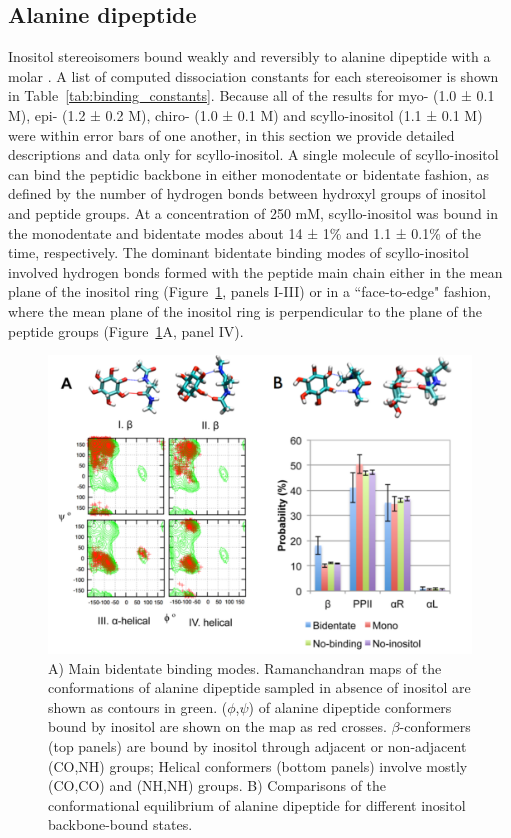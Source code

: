 \subsection{Alanine dipeptide}
Inositol stereoisomers bound weakly and reversibly to alanine dipeptide with a molar \KD. A list of computed dissociation constants for each stereoisomer is shown in Table~\ref{tab:binding_constants}. Because all of the results for myo- (1.0 ± 0.1 M), epi- (1.2 ± 0.2 M), chiro- (1.0 ± 0.1 M) and scyllo-inositol (1.1 ± 0.1 M) were within error bars of one another, in this section we provide detailed descriptions and data only for scyllo-inositol. A single molecule of scyllo-inositol can bind the peptidic backbone in either monodentate or bidentate fashion, as defined by the number of hydrogen bonds between hydroxyl groups of inositol and peptide groups. At a concentration of 250 mM, scyllo-inositol was bound in the monodentate and bidentate modes about 14 ± 1\% and 1.1 ± 0.1\% of the time, respectively. The dominant bidentate binding modes of scyllo-inositol involved hydrogen bonds formed with the peptide main chain either in the mean plane of the inositol ring (Figure~\ref{fig:figure2}, panels I-III) or in a ``face-to-edge" fashion, where the mean plane of the inositol ring is perpendicular to the plane of the peptide groups (Figure~\ref{fig:figure2}A, panel IV).
	
	\begin{figure}[htbp]
    \centering
    \includegraphics[width=6in]{figures/results1/GA4_paper_figures_submitted-2-rearranged}
    \caption[Binding of scyllo-inositol to the backbone of alanine dipeptide.]
     {A) Main bidentate binding modes. Ramanchandran maps of the conformations of alanine dipeptide sampled in absence of inositol are shown as contours in green. ($\phi$,$\psi$) of alanine dipeptide conformers bound by inositol are shown on the map as red crosses. $\beta$-conformers (top panels) are bound by inositol through adjacent or non-adjacent (CO,NH) groups; Helical conformers (bottom panels) involve mostly (CO,CO) and (NH,NH) groups. B) Comparisons of the conformational equilibrium of alanine dipeptide for different inositol backbone-bound states.}
     \label{fig:figure2}
  \end{figure}
  
